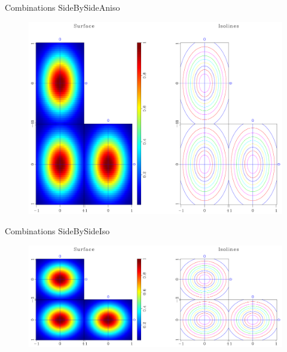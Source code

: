 \begin{frame}
  \begin{block}{Combinations}
    SideBySideAniso \\

     \begin{figure}
     \includegraphics[scale=0.25]{plot/Fig/sganom.pdf}
     \end{figure}

  \end{block}
\end{frame}

\begin{frame}
  \begin{block}{Combinations}
    SideBySideIso \\

     \begin{figure}
     \includegraphics[scale=0.25]{plot/Fig/ganom2.pdf}
     \end{figure}

  \end{block}
\end{frame}

